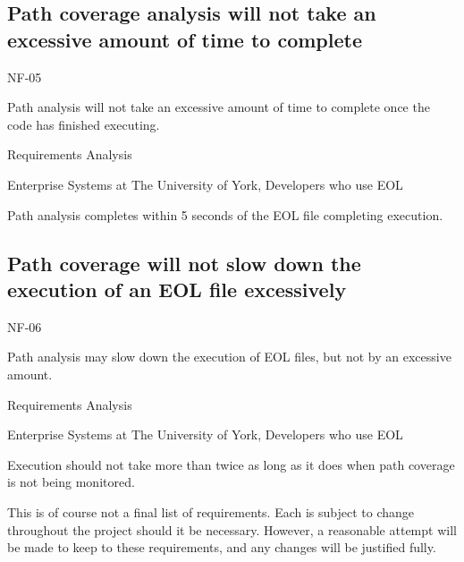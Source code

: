 \subsection{Path coverage analysis will not take an excessive amount of time to complete}
\begin{description}[style=sameline,leftmargin=4.5cm,nolistsep]
\item[\hspace*{0.3cm}Label] NF-05
\item[\hspace*{0.3cm}Description] Path analysis will not take an excessive amount of time to complete once the code has finished executing.
\item[\hspace*{0.3cm}Source] Requirements Analysis
\item[\hspace*{0.3cm}Stakeholders] Enterprise Systems at The University of York, Developers who use EOL
\item[\hspace*{0.3cm}Satisfiable Conditions] Path analysis completes within 5 seconds of the EOL file completing execution.
\end{description}

\subsection{Path coverage will not slow down the execution of an EOL file excessively}
\begin{description}[style=sameline,leftmargin=4.5cm,nolistsep]
\item[\hspace*{0.3cm}Label] NF-06
\item[\hspace*{0.3cm}Description] Path analysis may slow down the execution of EOL files, but not by an excessive amount.
\item[\hspace*{0.3cm}Source] Requirements Analysis
\item[\hspace*{0.3cm}Stakeholders] Enterprise Systems at The University of York, Developers who use EOL
\item[\hspace*{0.3cm}Satisfiable Conditions] Execution should not take more than twice as long as it does when path coverage is not being monitored.
\end{description}

This is of course not a final list of requirements. Each is subject to change throughout the project should it be necessary. However, a reasonable attempt will be made to keep to these requirements, and any changes will be justified fully.